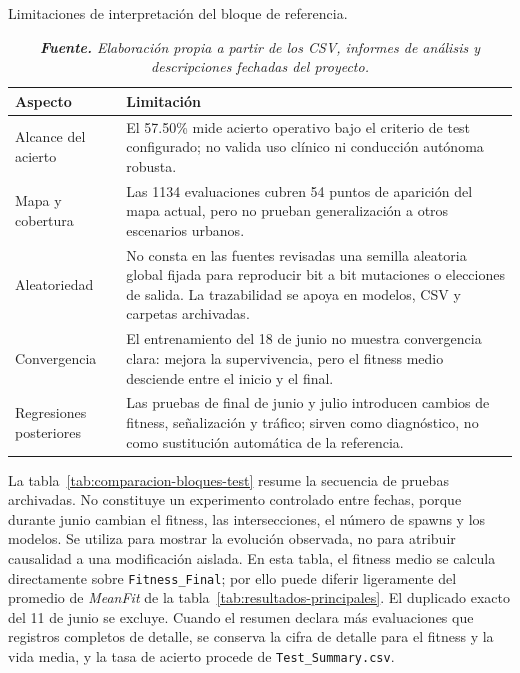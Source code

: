 \begin{table}[htbp]
\centering
\caption{Limitaciones de interpretación del bloque de referencia.}%
\label{tab:limitaciones-experimentales}
\begin{tabularx}{0.96\textwidth}{L{3.25cm}X}
\toprule
\textbf{Aspecto} & \textbf{Limitación}\\
\midrule
Alcance del acierto & El 57.50\% mide acierto operativo bajo el criterio de test configurado; no valida uso clínico ni conducción autónoma robusta.\\
Mapa y cobertura & Las 1134 evaluaciones cubren 54 puntos de aparición del mapa actual, pero no prueban generalización a otros escenarios urbanos.\\
Aleatoriedad & No consta en las fuentes revisadas una semilla aleatoria global fijada para reproducir bit a bit mutaciones o elecciones de salida. La trazabilidad se apoya en modelos, CSV y carpetas archivadas.\\
Convergencia & El entrenamiento del 18 de junio no muestra convergencia clara: mejora la supervivencia, pero el fitness medio desciende entre el inicio y el final.\\
Regresiones posteriores & Las pruebas de final de junio y julio introducen cambios de fitness, señalización y tráfico; sirven como diagnóstico, no como sustitución automática de la referencia.\\
\bottomrule
\end{tabularx}
\caption*{\textit{\textbf{Fuente.} Elaboración propia a partir de los CSV, informes de análisis y descripciones fechadas del proyecto.}}
\end{table}

La tabla~\ref{tab:comparacion-bloques-test} resume la secuencia de pruebas archivadas. No constituye un experimento controlado entre fechas, porque durante junio cambian el fitness, las intersecciones, el número de spawns y los modelos. Se utiliza para mostrar la evolución observada, no para atribuir causalidad a una modificación aislada. En esta tabla, el fitness medio se calcula directamente sobre \texttt{Fitness\_Final}; por ello puede diferir ligeramente del promedio de \textit{MeanFit} de la tabla~\ref{tab:resultados-principales}. El duplicado exacto del 11 de junio se excluye. Cuando el resumen declara más evaluaciones que registros completos de detalle, se conserva la cifra de detalle para el fitness y la vida media, y la tasa de acierto procede de \texttt{Test\_Summary.csv}.

